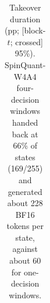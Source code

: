 \begin{table}[t]
\begin{tabular}{@{}llrrrr@{}}
\bottomrule
\end{tabular}
\caption{Takeover duration (pp; [block-$t$; crossed] 95\%). SpinQuant-W4A4 four-decision windows handed back at 66\% of states (169/255) and generated about 228 BF16 tokens per state, against about 60 for one-decision windows. %
}
\label{tab:takeover}
\end{table}

